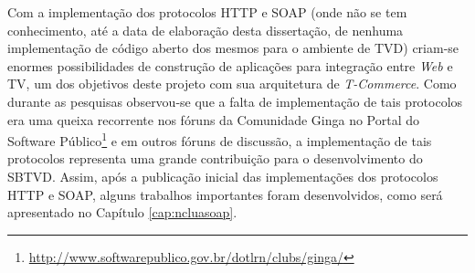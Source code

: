 Com a implementação dos protocolos HTTP e SOAP (onde não se tem conhecimento, até a data de elaboração
desta dissertação, de nenhuma implementação de código aberto dos mesmos para o ambiente de TVD) criam-se enormes possibilidades
de construção de aplicações para integração entre \textit{Web} e TV, um dos objetivos deste projeto
com sua arquitetura de \textit{T-Commerce}. Como durante as pesquisas observou-se que a falta
de implementação de tais protocolos era uma queixa recorrente nos fóruns da Comunidade
Ginga no Portal do Software Público\footnote{\url{http://www.softwarepublico.gov.br/dotlrn/clubs/ginga/}}
e em outros fóruns de discussão, a implementação de tais protocolos representa uma grande contribuição
para o desenvolvimento do SBTVD. Assim, após a publicação inicial das implementações
dos protocolos HTTP e SOAP, alguns trabalhos importantes foram desenvolvidos, como será apresentado no Capítulo \ref{cap:ncluasoap}.
